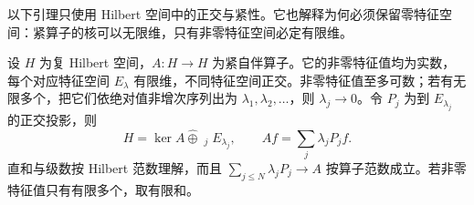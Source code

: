 以下引理只使用 Hilbert 空间中的正交与紧性。它也解释为何必须保留零特征空间：紧算子的核可以无限维，只有非零特征空间必定有限维。

\begin{lemma}\label{g1:lem:compact-selfadjoint-spectral}
	设 \(H\) 为复 Hilbert 空间，\(A:H\to H\) 为紧自伴算子。它的非零特征值均为实数，每个对应特征空间 \(E_\lambda\) 有限维，不同特征空间正交。非零特征值至多可数；若有无限多个，把它们依绝对值非增次序列出为 \(\lambda_1,\lambda_2,\ldots\)，则 \(\lambda_j\to0\)。令 \(P_j\) 为到 \(E_{\lambda_j}\) 的正交投影，则
	\[
		H=\ker A\mathbin{\widehat\oplus}
		\mathop{\widehat\bigoplus}_{j}E_{\lambda_j},
		\qquad Af=\sum_j\lambda_jP_jf.
	\]
	直和与级数按 Hilbert 范数理解，而且 \(\sum_{j\le N}\lambda_jP_j\to A\) 按算子范数成立。若非零特征值只有有限多个，取有限和。
\end{lemma}
